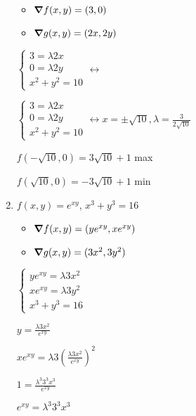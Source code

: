 \documentclass[../practica_06.tex]{subfiles}
\begin{document}
\begin{enumerate}
            \begin{itemize}
                \item $\grad f(x,y) = (3,0)$
                \item $\grad g(x,y) = (2x,2y)$
            \end{itemize}

            $\left \{\begin{array}{ll}
                3 = \lambda 2x \\
                0 = \lambda 2y \\
                x^2 + y^2 = 10
            \end{array} 
            \right. \leftrightarrow$ 

            $\left \{\begin{array}{ll}
                3 = \lambda 2x \\
                0 = \lambda 2y \\
                x^2 + y^2 = 10
            \end{array} 
            \right. \leftrightarrow x = \pm\sqrt{10}, \lambda = \frac{3}{2\sqrt{10}}$ 

            $f(-\sqrt{10}, 0) = 3\sqrt{10}+1$ max

            $f(\sqrt{10}, 0 )= -3\sqrt{10}+1$ min


        \item $f(x,y) = e^{xy}$, $x^3+y^3=16$
        
            \begin{itemize}
                \item $\grad f(x,y) = (ye^{xy}, xe^{xy})$
                \item $\grad g(x,y) = (3x^2, 3y^2)$
            \end{itemize}

            $\left \{\begin{array}{ll}
                ye^{xy} = \lambda 3x^2 \\
                xe^{xy} = \lambda 3y^2 \\
                x^3 + y^3=16
            \end{array} 
            \right.$

            $y = \frac{\lambda 3x^2}{e^{xy}}$

            $ xe^{xy} = \lambda 3(\frac{\lambda 3x^2}{e^{xy}})^2$

            $ 1 = \frac{\lambda^3 3^3x^3}{e^{xy}}$

            $e^{xy} = \lambda^3 3^3x^3$


\end{enumerate}
\end{document}
